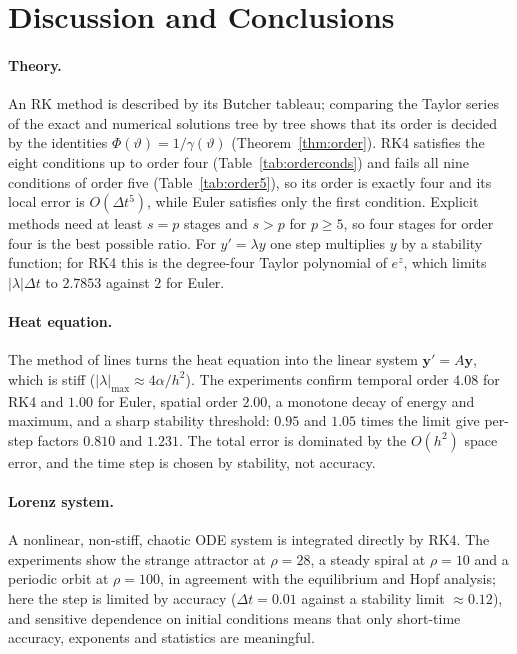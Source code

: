 \documentclass[11pt,a4paper]{article}
\newcommand{\Dt}{\Delta t}
\newcommand{\bfy}{\mathbf{y}}
\begin{document}
\section{Discussion and Conclusions}

\paragraph{Theory.} An RK method is described by its Butcher tableau; comparing the Taylor series of the
exact and numerical solutions tree by tree shows that its order is decided by the identities
$\Phi(\vartheta)=1/\gamma(\vartheta)$ (Theorem~\ref{thm:order}). RK4 satisfies the eight conditions up to order four
(Table~\ref{tab:orderconds}) and fails all nine conditions of order five (Table~\ref{tab:order5}), so its order is exactly
four and its local error is $O(\Dt^5)$, while Euler satisfies only the first condition. Explicit methods need at least
$s=p$ stages and $s>p$ for $p\ge5$, so four stages for order four is the best possible ratio. For $y'=\lambda y$ one step multiplies $y$ by a stability function; for RK4 this
is the degree-four Taylor polynomial of $e^z$, which limits $|\lambda|\Dt$ to $2.7853$ against $2$ for Euler.

\paragraph{Heat equation.} The method of lines turns the heat equation into the linear system
$\bfy'=A\bfy$, which is stiff ($|\lambda|_{\max}\approx4\alpha/h^2$). The experiments confirm temporal
order $4.08$ for RK4 and $1.00$ for Euler, spatial order $2.00$, a monotone decay of energy and maximum,
and a sharp stability threshold: $0.95$ and $1.05$ times the limit give per-step factors $0.810$ and
$1.231$. The total error is dominated by the $O(h^2)$ space error, and the time step is chosen by
stability, not accuracy.

\paragraph{Lorenz system.} A nonlinear, non-stiff, chaotic ODE system is integrated directly by RK4. The
experiments show the strange attractor at $\rho=28$, a steady spiral at $\rho=10$ and a periodic orbit
at $\rho=100$, in agreement with the equilibrium and Hopf analysis; here the step is limited by accuracy
($\Dt=0.01$ against a stability limit $\approx0.12$), and sensitive dependence on initial conditions means
that only short-time accuracy, exponents and statistics are meaningful.
\end{document}
